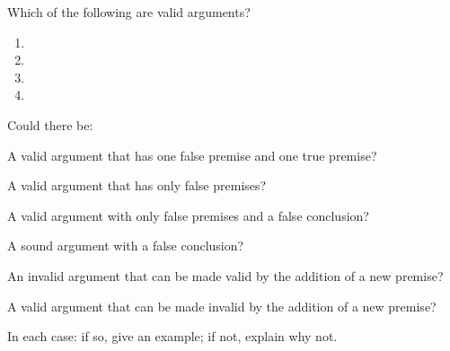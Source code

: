 \problempart
Which of the following are valid arguments? \begin{enumerate}
	\item {}
\item {}
\item {}
\item {}
\end{enumerate}

\problempart
\label{pr.EnglishCombinations}
Could there be:
	\begin{earg}
		\item A valid argument that has one false premise and one true premise?
		\item A valid argument that has only false premises?
		\item A valid argument with only false premises and a false conclusion?
		\item A sound argument with a false conclusion?
		\item An invalid argument that can be made valid by the addition of a new premise?
		\item A valid argument that can be made invalid by the addition of a new premise?
	\end{earg}
In each case: if so, give an example; if not, explain why not.


